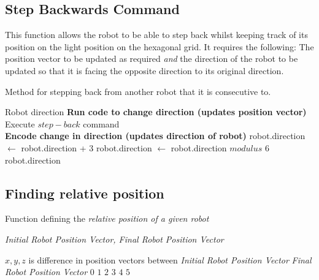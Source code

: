 \subsection{Step Backwards Command}
\label{function:stepback_function}
This function allows the robot to be able to step back whilst keeping track of its position on the light position on the hexagonal grid.
It requires the following: The position vector to be updated as required \textit{and} the direction of the robot to be updated so that it is facing the opposite direction to its original direction.
\begin{algorithm}[H]
\caption{Method for stepping back from another robot that it is consecutive to.}
\begin{algorithmic}

\REQUIRE Robot direction
\STATE \textbf{Run code to change direction (updates position vector)}
\bindent{}
\STATE Execute $step-back$ command
\eindent{}
\\ \textbf{Encode change in direction (updates direction of robot)}
\bindent{}
\STATE robot.direction $\leftarrow$ robot.direction + 3
\STATE robot.direction $\leftarrow$ robot.direction $modulus$ 6 
\eindent{}
\RETURN robot.direction




\end{algorithmic}
\end{algorithm}



\subsection{Finding relative position}
\label{function:def_relative_position}
\begin{algorithm}[H]
\caption{Function defining the \textit{relative position of a given robot}}
 \begin{algorithmic}
 \REQUIRE \textit{Initial Robot Position Vector, Final Robot Position Vector}
 
 $x, y, z$ is difference in position vectors between \textit{Initial Robot Position Vector} \AND \textit{Final Robot Position Vector}
    \RETURN {}
    \RETURN $0$
    \RETURN $1$
    \RETURN $2$
    \RETURN $3$   
    \RETURN $4$  
    \RETURN $5$  
\ENDIF

 \end{algorithmic}
\end{algorithm}


